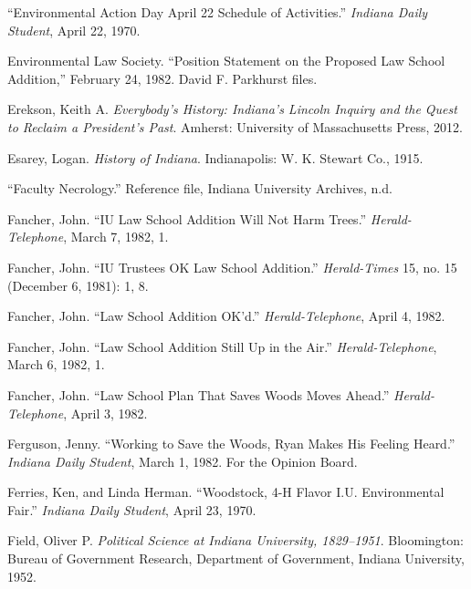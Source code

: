 \documentclass[
  american,
  letterpaper,
]{scrreprt}
\newlength{\cslhangindent}
\newenvironment{CSLReferences}[2] %
 {\begin{list}{}{%
  \setlength{\itemindent}{0pt}
  \setlength{\leftmargin}{0pt}
  \setlength{\parsep}{0pt}
  \ifodd #1
   \setlength{\leftmargin}{\cslhangindent}
   \setlength{\itemindent}{-1\cslhangindent}
  \fi
  \setlength{\itemsep}{#2\baselineskip}}}
 {\end{list}}
\begin{document}
\begin{CSLReferences}{1}{0}
{``Environmental Action Day April 22 Schedule of Activities.''}
\emph{Indiana Daily Student}, April 22, 1970.

Environmental Law Society. {``Position Statement on the Proposed Law
School Addition,''} February 24, 1982. David F. Parkhurst files.

Erekson, Keith A. \emph{Everybody's History: Indiana's Lincoln Inquiry
and the Quest to Reclaim a President's Past}. Amherst: University of
Massachusetts Press, 2012.

Esarey, Logan. \emph{History of Indiana}. Indianapolis: W. K. Stewart
Co., 1915.

{``Faculty Necrology.''} Reference file, Indiana University Archives,
n.d.

Fancher, John. {``IU Law School Addition Will Not Harm Trees.''}
\emph{Herald-Telephone}, March 7, 1982, 1.

Fancher, John. {``IU Trustees OK Law School Addition.''}
\emph{Herald-Times} 15, no. 15 (December 6, 1981): 1, 8.

Fancher, John. {``Law School Addition OK'd.''} \emph{Herald-Telephone},
April 4, 1982.

Fancher, John. {``Law School Addition Still {Up} in the Air.''}
\emph{Herald-Telephone}, March 6, 1982, 1.

Fancher, John. {``Law School Plan That Saves Woods Moves Ahead.''}
\emph{Herald-Telephone}, April 3, 1982.

Ferguson, Jenny. {``Working to Save the Woods, Ryan Makes His Feeling
Heard.''} \emph{Indiana Daily Student}, March 1, 1982. For the Opinion
Board.

Ferries, Ken, and Linda Herman. {``{Woodstock, 4-H Flavor I.U.
Environmental Fair}.''} \emph{Indiana Daily Student}, April 23, 1970.

Field, Oliver P. \emph{Political Science at Indiana University,
1829--1951}. Bloomington: Bureau of Government Research, Department of
Government, Indiana University, 1952.


\end{CSLReferences}
\end{document}
